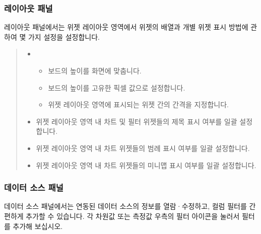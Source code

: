 \documentclass[letterpaper,10pt,english]{sphinxmanual}
\begin{document}
\subsubsection{레이아웃 패널}
\label{\detokenize{discovery/part04/change_dashboard_layout_and_size:id5}}
레이아웃 패널에서는 위젯 레이아웃 영역에서 위젯의 배열과 개별 위젯 표시 방법에 관하여 몇 가지 설정을 설정합니다.
\begin{quote}

\begin{figure}[H]
\centering

\noindent{}
\end{figure}
\begin{itemize}
\item {} 
\begin{itemize}
\item {} 
 보드의 높이를 화면에 맞춥니다.

\item {} 
 보드의 높이를 고유한 픽셀 값으로 설정합니다.

\item {} 
 위젯 레이아웃 영역에 표시되는 위젯 간의 간격을 지정합니다.

\end{itemize}

\item {} 
 위젯 레이아웃 영역 내 차트 및 필터 위젯들의 제목 표시 여부를 일괄 설정합니다.

\item {} 
 위젯 레이아웃 영역 내 차트 위젯들의 범례 표시 여부를 일괄 설정합니다.

\item {} 
 위젯 레이아웃 영역 내 차트 위젯들의 미니맵 표시 여부를 일괄 설정합니다.

\end{itemize}
\end{quote}


\subsubsection{데이터 소스 패널}
\label{\detokenize{discovery/part04/change_dashboard_layout_and_size:id6}}
데이터 소스 패널에서는 연동된 데이터 소스의 정보를 열람·수정하고, 컬럼 필터를 간편하게 추가할 수 있습니다. 각 차원값 또는 측정값 우측의 필터 아이콘을 눌러서 필터를 추가해 보십시오.
\begin{quote}

\begin{figure}[H]
\centering

\noindent{}
\end{figure}
\end{quote}
\end{document}
